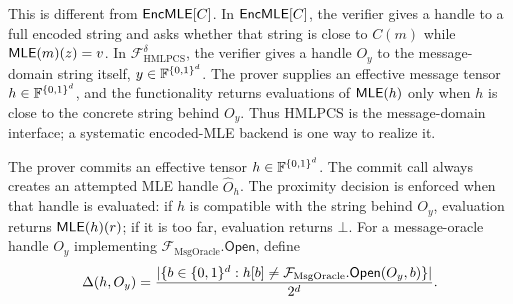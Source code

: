 This is different from \(\mathsf{EncMLE}[C]\).  In \(\mathsf{EncMLE}[C]\), the verifier gives a
handle to a full encoded string and asks whether that string is close to
\(C(m)\) while \(\mathsf{MLE}(m)(z)=v\).  In \(\mathcal F_{\mathrm{HMLPCS}}^\delta\),
the verifier gives a handle \(O_y\) to the message-domain string itself,
\(y\in\mathbb{F}^{\{0,1\}^d}\).  The prover supplies an effective message tensor
\(h\in\mathbb{F}^{\{0,1\}^d}\), and the functionality returns evaluations of
\(\mathsf{MLE}(h)\) only when \(h\) is close to the concrete string behind \(O_y\).
Thus HMLPCS is the message-domain interface; a systematic encoded-MLE backend
is one way to realize it.

The prover commits an effective tensor
\(h\in\mathbb{F}^{\{0,1\}^d}\).  The commit call always creates an attempted MLE handle
\(\widehat O_h\).  The proximity decision is enforced when that handle is
evaluated: if \(h\) is compatible with the string behind \(O_y\), evaluation
returns \(\mathsf{MLE}(h)(r)\); if it is too far, evaluation returns \(\bot\).
For a message-oracle handle \(O_y\) implementing
\(\mathcal F_{\mathrm{MsgOracle}}.\mathsf{Open}\), define
\[
  \Delta(h,O_y)
  =
  \frac{
    |\{b\in\{0,1\}^d:
      h[b]\ne \mathcal F_{\mathrm{MsgOracle}}.\mathsf{Open}(O_y,b)\}|
  }{2^d}.
\]

